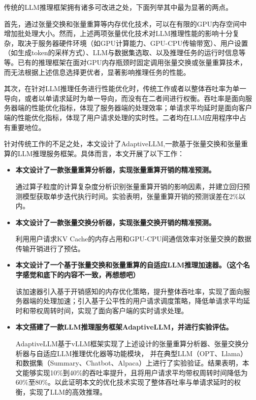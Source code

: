 传统的LLM推理框架拥有诸多可改进之处，下面列举其中最为显著的两点。 \par

首先，通过张量交换和张量重算等内存优化技术，可以在有限的GPU内存空间中增加批处理大小。然而，上述两项张量优化技术对LLM推理性能的影响十分复杂，取决于服务器硬件环境（如GPU计算能力、GPU-CPU传输带宽）、用户设置（如生成token的采样方式）、LLM与数据集选取、以及推理任务的运行时信息等等。已有的推理框架\cite{Swapping, vLLM, ORCA}在面对GPU内存瓶颈时固定调用张量交换或张量重算技术，而无法根据上述信息选择更优者，显著影响推理任务的性能。 \par

其次，在针对LLM推理任务进行性能优化时，传统工作\cite{Swapping, vLLM, SpecInfer}或者以整体吞吐率为单一导向，或者以单请求延时为单一导向，而没有在二者间进行权衡。吞吐率是面向服务器端的性能优化指标，体现了服务器端的处理效率；单请求平均延时是面向客户端的性能优化指标，体现了用户请求处理的实时性。二者均在LLM应用程序中占有重要地位。\par

针对传统工作的不足之处，本文设计了AdaptiveLLM,一款基于张量交换和张量重算的LLM推理服务框架。具体而言，本文开展了以下工作：

\begin{itemize} 
    \item { \textbf{本文设计了一款张量重算分析器，实现张量重算开销的精准预测。} 
    \setlength{\parindent}{2em} \par
    通过算子粒度的计算复杂度分析识别张量重算开销的影响因素，并建立回归预测模型获取单步迭代执行时间。实验表明，张量重算开销的预测误差在2\%以内。}
    \item \textbf{本文设计了一款张量交换分析器，实现张量交换开销的精准预测。}
    \setlength{\parindent}{2em} \par
    利用用户请求KV Cache的内存占用和GPU-CPU间通信效率对张量交换的数据传输开销进行了预估。
    \item \textbf{本文设计了一个基于张量交换和张量重算的自适应LLM推理加速器。（这个名字感觉和底下的内容不一致，再想想吧）}
    \setlength{\parindent}{2em} \par
    该加速器引入基于开销感知的内存优化策略，提升整体吞吐率，实现了面向服务器端的处理加速；引入基于公平性的用户请求调度策略，降低单请求平均延时和带权周转时间，实现了面向客户端的实时请求处理。
    \item \textbf{本文搭建了一款LLM推理服务框架AdaptiveLLM，并进行实验评估。}
    \setlength{\parindent}{2em} \par
    AdaptiveLLM基于vLLM框架实现了上述设计的张量重算分析器、张量交换分析器与自适应LLM推理优化器等功能模块， 并在典型LLM（OPT\cite{OPT}、Llama\cite{Llama}）和数据集（Summary\cite{Summary}、Chatbot\cite{Chatbot}、Alpaca\cite{Alpaca}）上进行了实验验证。结果表明，本文能够实现10\%到40\%的吞吐率提升，且将用户请求平均带权周转时间降低为60\%至80\%。以此证明本文的优化技术实现了整体吞吐率与单请求延时的权衡，实现了LLM的高效推理。
\end{itemize}